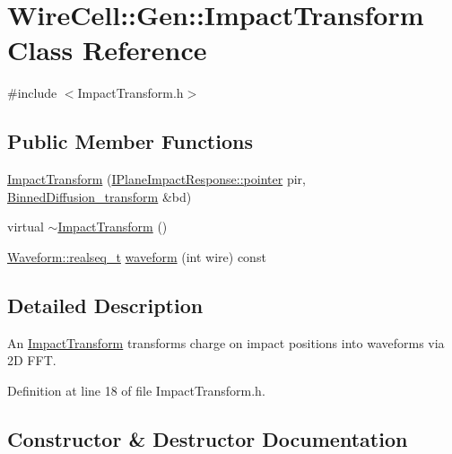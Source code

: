 \hypertarget{class_wire_cell_1_1_gen_1_1_impact_transform}{}\section{Wire\+Cell\+:\+:Gen\+:\+:Impact\+Transform Class Reference}
\label{class_wire_cell_1_1_gen_1_1_impact_transform}


{\ttfamily \#include $<$Impact\+Transform.\+h$>$}

\subsection*{Public Member Functions}
\begin{DoxyCompactItemize}
\item 
\hyperlink{class_wire_cell_1_1_gen_1_1_impact_transform_ad467b6b26b2e740a1c170cb8a5223e6e}{Impact\+Transform} (\hyperlink{class_wire_cell_1_1_interface_a09c548fb8266cfa39afb2e74a4615c37}{I\+Plane\+Impact\+Response\+::pointer} pir, \hyperlink{class_wire_cell_1_1_gen_1_1_binned_diffusion__transform}{Binned\+Diffusion\+\_\+transform} \&bd)
\item 
virtual \hyperlink{class_wire_cell_1_1_gen_1_1_impact_transform_a01530f803d5d1cc06688fb37e4163acb}{$\sim$\+Impact\+Transform} ()
\item 
\hyperlink{namespace_wire_cell_1_1_waveform_a479175e541c8545e87cd8063b74b6956}{Waveform\+::realseq\+\_\+t} \hyperlink{class_wire_cell_1_1_gen_1_1_impact_transform_ad65b81bab03b2a6f8836782c732556bc}{waveform} (int wire) const
\end{DoxyCompactItemize}


\subsection{Detailed Description}
An \hyperlink{class_wire_cell_1_1_gen_1_1_impact_transform}{Impact\+Transform} transforms charge on impact positions into waveforms via 2D F\+FT. 

Definition at line 18 of file Impact\+Transform.\+h.



\subsection{Constructor \& Destructor Documentation}
\mbox{\label{class_wire_cell_1_1_gen_1_1_impact_transform_ad467b6b26b2e740a1c170cb8a5223e6e}} 
